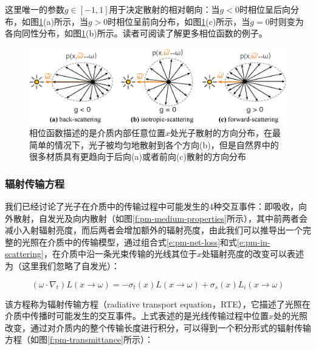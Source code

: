 \noindent 这里唯一的参数$g\in[-1,1]$用于决定散射的相对朝向：当$g<0$时相位呈后向分布，如图\ref{f:pm-phase-function}(a)所示，当$g>0$时相位呈前向分布，如图\ref{f:pm-phase-function}(c)所示，当$g=0$时则变为各向同性分布，如图\ref{f:pm-phase-function}(b)所示。读者可阅读\cite{a:EfficientMonteCarloMethodsforLightTransportinScatteringMedia}了解更多相位函数的例子。

\begin{figure}
\begin{fullwidth}
	\includegraphics[width=\thewidth]{figures/pm/phase-function}
	\caption{相位函数描述的是介质内部任意位置$x$处光子散射的方向分布，在最简单的情况下，光子被均匀地散射到各个方向(b)，但是自然界中的很多材质具有更趋向于后向(a)或者前向(c)散射的方向分布}
	\label{f:pm-phase-function}
\end{fullwidth}
\end{figure}






\subsubsection{辐射传输方程}
我们已经讨论了光子在介质中的传输过程中可能发生的4种交互事件：即吸收，向外散射，自发光及向内散射（如图\ref{f:pm-medium-properties}所示），其中前两者会减小入射辐射亮度，而后两者会增加额外的辐射亮度，由此我们可以推导出一个完整的光照在介质中的传输模型，通过组合式\ref{e:pm-net-loss}和式\ref{e:pm-in-scattering}，在介质中沿一条光束传输的光线其位于$x$处辐射亮度的改变可以表述为（这里我们忽略了自发光）：

\begin{equation}
	({\omega}\cdot\nabla_t)L(x\to{\omega})=-\sigma_t(x)L(x\to{\omega})+\sigma_s(x)L_i(x\to{\omega})
\end{equation}

该方程称为辐射传输方程（radiative transport equation，RTE）\cite{a:RadiativeTransfer}，它描述了光照在介质中传播时可能发生的交互事件。上式表述的是光线传输过程中位置$x$处的光照改变，通过对介质内的整个传输长度进行积分，可以得到一个积分形式的辐射传输方程（如图\ref{f:pm-transmittance}所示）：

